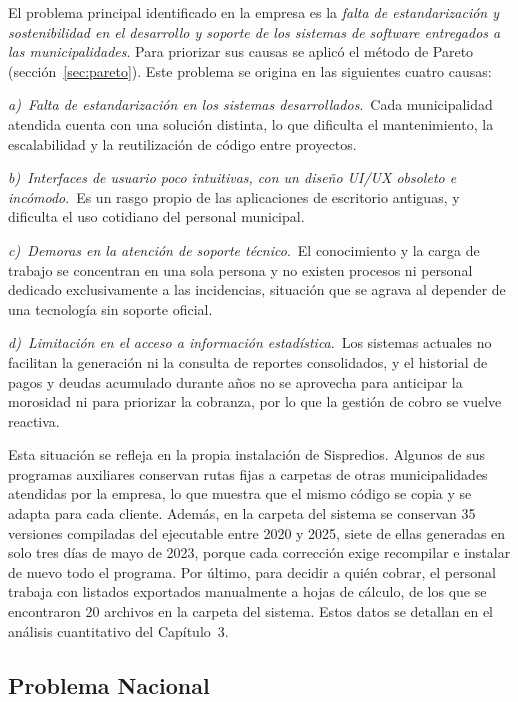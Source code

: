 \documentclass[12pt,a4paper]{report}
\newcommand{\causa}[2]{\par\textit{#1)~#2}.\ }
\begin{document}
El problema principal identificado en la empresa es la \textit{falta de estandarización y sostenibilidad en el desarrollo y soporte de los sistemas de software entregados a las municipalidades}. Para priorizar sus causas se aplicó el método de Pareto (sección~\ref{sec:pareto}). Este problema se origina en las siguientes cuatro causas:

\causa{a}{Falta de estandarización en los sistemas desarrollados}Cada municipalidad atendida cuenta con una solución distinta, lo que dificulta el mantenimiento, la escalabilidad y la reutilización de código entre proyectos.

\causa{b}{Interfaces de usuario poco intuitivas, con un diseño UI/UX obsoleto e incómodo}Es un rasgo propio de las aplicaciones de escritorio antiguas, y dificulta el uso cotidiano del personal municipal.

\causa{c}{Demoras en la atención de soporte técnico}El conocimiento y la carga de trabajo se concentran en una sola persona y no existen procesos ni personal dedicado exclusivamente a las incidencias, situación que se agrava al depender de una tecnología sin soporte oficial.

\causa{d}{Limitación en el acceso a información estadística}Los sistemas actuales no facilitan la generación ni la consulta de reportes consolidados, y el historial de pagos y deudas acumulado durante años no se aprovecha para anticipar la morosidad ni para priorizar la cobranza, por lo que la gestión de cobro se vuelve reactiva. %

Esta situación se refleja en la propia instalación de Sispredios. Algunos de sus programas auxiliares conservan rutas fijas a carpetas de otras municipalidades atendidas por la empresa, lo que muestra que el mismo código se copia y se adapta para cada cliente. Además, en la carpeta del sistema se conservan 35 versiones compiladas del ejecutable entre 2020 y 2025, siete de ellas generadas en solo tres días de mayo de 2023, porque cada corrección exige recompilar e instalar de nuevo todo el programa. Por último, para decidir a quién cobrar, el personal trabaja con listados exportados manualmente a hojas de cálculo, de los que se encontraron 20 archivos en la carpeta del sistema. Estos datos se detallan en el análisis cuantitativo del Capítulo~3.

\subsection{Problema Nacional}
\end{document}
